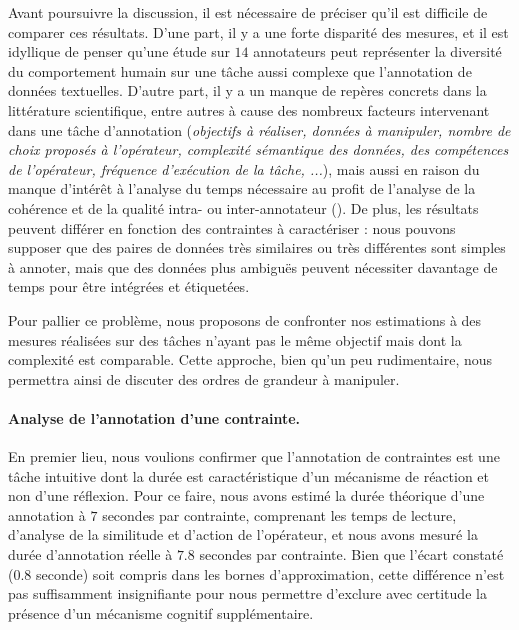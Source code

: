 		\begin{leftBarAuthorOpinion}
			Avant poursuivre la discussion, il est nécessaire de préciser qu'il est difficile de comparer ces résultats.
			D'une part, il y a une forte disparité des mesures, et il est idyllique de penser qu'une étude sur $14$ annotateurs peut représenter la diversité du comportement humain sur une tâche aussi complexe que l'annotation de données textuelles.
			D'autre part, il y a un manque de repères concrets dans la littérature scientifique, entre autres à cause des nombreux facteurs intervenant dans une tâche d'annotation (\textit{objectifs à réaliser, données à manipuler, nombre de choix proposés à l'opérateur, complexité sémantique des données, des compétences de l'opérateur, fréquence d'exécution de la tâche, ...}), mais aussi en raison du manque d'intérêt à l'analyse du temps nécessaire au profit de l'analyse de la cohérence et de la qualité intra- ou inter-annotateur (\cite{baledent:2022:complexite-annotation-manuelle}).
			De plus, les résultats peuvent différer en fonction des contraintes à caractériser : nous pouvons supposer que des paires de données très similaires ou très différentes sont simples à annoter, mais que des données plus ambiguës peuvent nécessiter davantage de temps pour être intégrées et étiquetées.
			
			Pour pallier ce problème, nous proposons de confronter nos estimations à des mesures réalisées sur des tâches n'ayant pas le même objectif mais dont la complexité est comparable.
			Cette approche, bien qu'un peu rudimentaire, nous permettra ainsi de discuter des ordres de grandeur à manipuler.
		\end{leftBarAuthorOpinion}
		
		
		\paragraph{Analyse de l'annotation d'une contrainte.}
		
			En premier lieu, nous voulions confirmer que l'annotation de contraintes est une tâche intuitive dont la durée est caractéristique d'un mécanisme de réaction et non d'une réflexion.
			Pour ce faire, nous avons estimé la durée théorique d'une annotation à $7$ secondes par contrainte, comprenant les temps de lecture, d'analyse de la similitude et d'action de l'opérateur, et nous avons mesuré la durée d'annotation réelle à $7.8$ secondes par contrainte.
			Bien que l'écart constaté ($0.8$ seconde) soit compris dans les bornes d'approximation, cette différence n'est pas suffisamment insignifiante pour nous permettre d'exclure avec certitude la présence d'un mécanisme cognitif supplémentaire.
				
